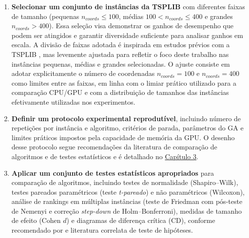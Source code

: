 \begin{enumerate}
            As quatro variantes não são implementações separadas: todas usam o mesmo algoritmo genético, e cada variante define apenas quais implementações ocupam as etapas de inicialização, seleção, cruzamento, mutação, busca local e avaliação.
            A composição de cada variante e a arquitetura resultante são apresentadas na \hyperref[sec-32-arquitetura-variantes]{Seção 3.2}.
            Na literatura, o termo ``naive'' (ingênuo) é frequentemente utilizado para descrever implementações simples que não exploram otimizações avançadas.
      \item
            \textbf{Selecionar um conjunto de instâncias da TSPLIB} com diferentes faixas de tamanho (pequenas \(n_{coords} \leq 100\), médias \(100 < n_{coords} \leq 400\) e grandes \(n_{coords} > 400\)).
            Essa seleção visa demonstrar os ganhos de desempenho que podem ser atingidos e garantir diversidade suficiente para analisar ganhos em escala.
            A divisão de faixas adotada é inspirada em estudos prévios com a TSPLIB \autocite{reinelt1991tsplib}, mas levemente ajustada para refletir o foco deste trabalho nas instâncias pequenas, médias e grandes selecionadas.
            O ajuste consiste em adotar explicitamente o número de coordenadas \(n_{coords} = 100\) e \(n_{coords} = 400\) como limites entre as faixas, em linha com o limiar prático utilizado para a comparação CPU/GPU e com a distribuição de tamanhos das instâncias efetivamente utilizadas nos experimentos.
      \item
            \textbf{Definir um protocolo experimental reprodutível}, incluindo número de repetições por instância e algoritmo, critérios de parada, parâmetros do GA e limites práticos impostos pela capacidade de memória da GPU.
            O desenho desse protocolo segue recomendações da literatura de comparação de algoritmos e de testes estatísticos \autocite{demsar2006statistical} e é detalhado no \hyperref[cap3-materiais-metodos]{Capítulo 3}.
      \item
            \textbf{Aplicar um conjunto de testes estatísticos apropriados} para comparação de algoritmos, incluindo testes de normalidade (Shapiro--Wilk), testes pareados paramétricos (teste \emph{t-pareado}) e não paramétricos (Wilcoxon), análise de rankings em múltiplas instâncias (teste de Friedman com pós-teste de Nemenyi e correção \emph{step-down} de Holm--Bonferroni), medidas de tamanho de efeito (Cohen \(d\)) e diagramas de diferença crítica (CD), conforme recomendado por \textcite{demsar2006statistical} e literatura correlata de teste de hipóteses.

\end{enumerate}
